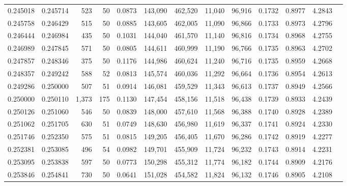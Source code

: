 \begin{tabular}{rrrrrrrrrrrrr}
0.245018 & 0.245714 &    523 &    50 &                                     0.0873 & 143,090 & 462,520 &  11,040 &  96,916 & 0.1732 & 0.8977 & 4.2843 \\
0.245758 & 0.246429 &    515 &    50 &                                     0.0885 & 143,605 & 462,005 &  11,090 &  96,866 & 0.1733 & 0.8973 & 4.2796 \\
0.246444 & 0.246984 &    435 &    50 &                                     0.1031 & 144,040 & 461,570 &  11,140 &  96,816 & 0.1734 & 0.8968 & 4.2755 \\
0.246989 & 0.247845 &    571 &    50 &                                     0.0805 & 144,611 & 460,999 &  11,190 &  96,766 & 0.1735 & 0.8963 & 4.2702 \\
0.247857 & 0.248346 &    375 &    50 &                                     0.1176 & 144,986 & 460,624 &  11,240 &  96,716 & 0.1735 & 0.8959 & 4.2668 \\
0.248357 & 0.249242 &    588 &    52 &                                     0.0813 & 145,574 & 460,036 &  11,292 &  96,664 & 0.1736 & 0.8954 & 4.2613 \\
0.249286 & 0.250000 &    507 &    51 &                                     0.0914 & 146,081 & 459,529 &  11,343 &  96,613 & 0.1737 & 0.8949 & 4.2566 \\
0.250000 & 0.250110 &  1,373 &   175 &                                     0.1130 & 147,454 & 458,156 &  11,518 &  96,438 & 0.1739 & 0.8933 & 4.2439 \\
0.250126 & 0.251060 &    546 &    50 &                                     0.0839 & 148,000 & 457,610 &  11,568 &  96,388 & 0.1740 & 0.8928 & 4.2389 \\
0.251062 & 0.251705 &    630 &    51 &                                     0.0749 & 148,630 & 456,980 &  11,619 &  96,337 & 0.1741 & 0.8924 & 4.2330 \\
0.251746 & 0.252350 &    575 &    51 &                                     0.0815 & 149,205 & 456,405 &  11,670 &  96,286 & 0.1742 & 0.8919 & 4.2277 \\
0.252381 & 0.253085 &    496 &    54 &                                     0.0982 & 149,701 & 455,909 &  11,724 &  96,232 & 0.1743 & 0.8914 & 4.2231 \\
0.253095 & 0.253838 &    597 &    50 &                                     0.0773 & 150,298 & 455,312 &  11,774 &  96,182 & 0.1744 & 0.8909 & 4.2176 \\
0.253846 & 0.254841 &    730 &    50 &                                     0.0641 & 151,028 & 454,582 &  11,824 &  96,132 & 0.1746 & 0.8905 & 4.2108 \\

\end{tabular}
